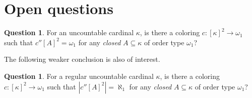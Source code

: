 \documentclass[12pt]{amsart}
\theoremstyle{definition}
\newtheorem{question}[definition]{Question}
\theoremstyle{plain}
\theoremstyle{plain}
\begin{document}
\section{Open questions}\label{section: questions}

\begin{question}
For an uncountable cardinal $\kappa$, is there a coloring $c: [\kappa]^2\to \omega_1$ such that  $c''[A]^2 = \omega_1$ for any \emph{closed} $A\subseteq \kappa$ of order type $\omega_1$?
\end{question}

The following weaker conclusion is also of interest. 

\begin{question}
For a regular uncountable cardinal $\kappa$, is there a coloring $c: [\kappa]^2\to \omega_1$ such that $|c''[A]^2| = \aleph_1$ for any \emph{closed} $A\subseteq \kappa$ of order type $\omega_1$?
\end{question}



\end{document}

